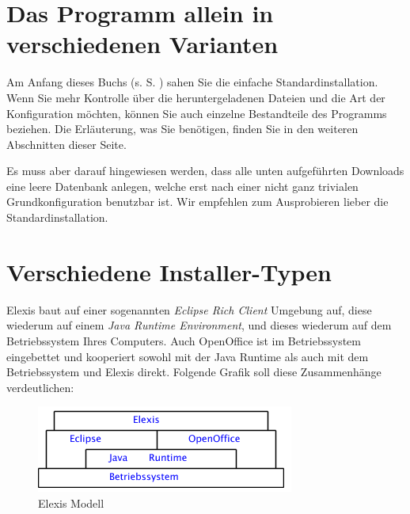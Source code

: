 %

\section{Das Programm allein in verschiedenen Varianten}
\label{varianten}
Am Anfang dieses Buchs (s. S. \pageref{easyinstall}) sahen Sie die einfache Standardinstallation. Wenn Sie mehr Kontrolle über die heruntergeladenen Dateien und die Art der Konfiguration möchten, können Sie auch einzelne Bestandteile des Programms beziehen. Die Erläuterung, was Sie benötigen, finden Sie in den
weiteren Abschnitten dieser Seite.

Es muss aber darauf hingewiesen werden, dass alle unten aufgeführten Downloads eine leere Datenbank anlegen, welche erst nach einer nicht ganz trivialen
Grundkonfiguration benutzbar ist. Wir empfehlen zum Ausprobieren lieber die 
Standardinstallation.

\section{Verschiedene Installer-Typen}
Elexis baut auf einer sogenannten \textit{Eclipse Rich Client} Umgebung auf, diese wiederum auf
einem \textit{Java Runtime Environment}, und dieses wiederum auf dem Betriebssystem Ihres Computers. Auch OpenOffice ist im Betriebssystem eingebettet und kooperiert sowohl mit der Java Runtime als auch mit dem Betriebssystem und Elexis direkt. Folgende Grafik soll diese Zusammenhänge verdeutlichen:
\begin{figure}[hb]
\includegraphics{images/modell}
\caption{Elexis Modell}
\label{Aufbau von Elexis}
\end{figure}

